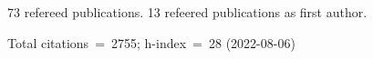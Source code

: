 73 refereed publications. 13 refeered publications as first author.

Total citations~=~2755; h-index~=~28 (2022-08-06)